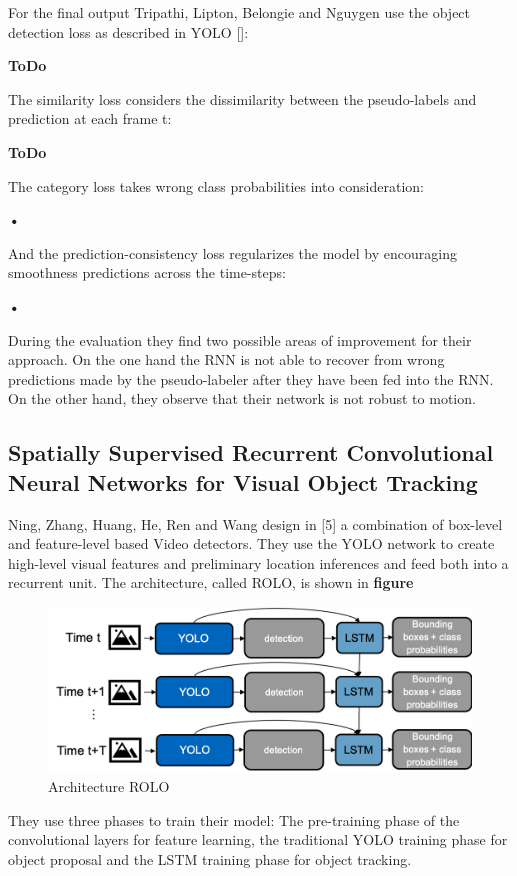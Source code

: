 \documentclass[conference]{IEEEtran}
\begin{document}
For the final output Tripathi, Lipton, Belongie and Nguygen use the object detection loss as described in YOLO []:

\textbf{ToDo}

The similarity loss considers the dissimilarity between the pseudo-labels and prediction at each frame t:

\textbf{ToDo}

The category loss takes wrong class probabilities into consideration:  

\textbf{•}

And the prediction-consistency loss regularizes the model by encouraging smoothness predictions across the time-steps:

\textbf{•}

During the evaluation they find two possible areas of improvement for their approach. On the one hand the RNN is not able to recover from wrong predictions made by the pseudo-labeler after they have been fed into the RNN.  On the other hand, they observe that their network is not robust to motion. 

\subsection{Spatially Supervised Recurrent Convolutional Neural Networks for Visual Object Tracking}
Ning, Zhang, Huang, He, Ren and Wang design in [5] a combination of box-level and feature-level based Video detectors. They use the YOLO network to create high-level visual features and preliminary location inferences and feed both into a recurrent unit. The architecture, called ROLO, is shown in \textbf{figure} 

\begin{figure} [h]
\includegraphics[width=\columnwidth]{ROLO}
\caption{Architecture ROLO}
\end{figure}

They use three phases to train their model: The pre-training phase of the convolutional layers for feature learning, the traditional YOLO training phase for object proposal and the LSTM training phase for object tracking.  \newline
\end{document}
